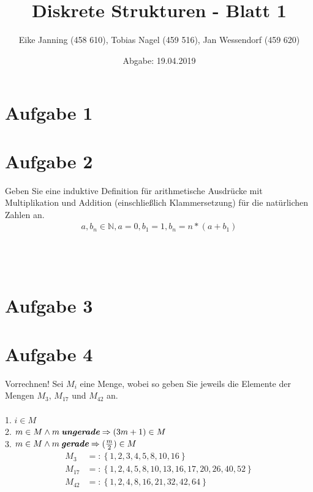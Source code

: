 \documentclass[11pt]{article}
\title{Diskrete Strukturen - Blatt 1}
\author{Eike Janning (458 610), Tobias Nagel (459 516), Jan Wessendorf (459 620)}
\date{Abgabe: 19.04.2019}
\begin{document}
\maketitle

\section*{Aufgabe 1}

\pagebreak

\section*{Aufgabe 2}
	 Geben Sie eine induktive Definition für arithmetische Ausdrücke mit Multiplikation und Addition (einschließlich Klammersetzung) für die natürlichen Zahlen an.\\
	 	\begin{align*}
		 	a, b_n \in \mathbb{N}, a = 0, b_1 = 1, b_n = n*(a+b_1)
	 	\end{align*}\\\\\\

\section*{Aufgabe 3}
	
\pagebreak

\section*{Aufgabe 4} Vorrechnen!
Sei $M_i$ eine Menge, wobei  so geben Sie jeweils die Elemente der Mengen $M_3$, $M_{17}$ und $M_{42}$ an.\\\\
	1. $ i \in M$\\
	2. $m \in M \land m\: \textit{\textbf{ungerade}} \Rightarrow (3m+1) \in M$\\
	3. $m \in M \land m\: \textit{\textbf{gerade}} \Rightarrow (\frac{m}{2}) \in M$
		\begin{align*}
			M_3 &=: \left\{1,2,3,4,5,8,10,16\right\}\\
			M_{17} &=: \left\{1,2,4,5,8,10,13,16,17,20,26,40,52\right\}\\
			M_{42} &=: \left\{1,2,4,8,16,21,32,42,64\right\}
		\end{align*}\\\\\\
		
\end{document}

